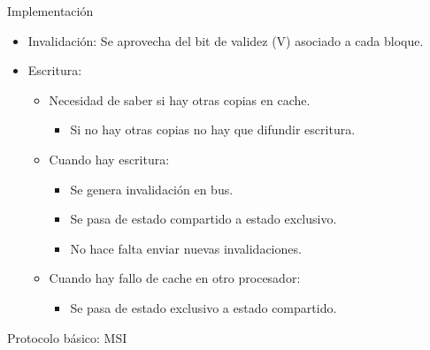 \documentclass[12pt, twoside, openright]{report} %
\begin{document}
    Implementación

    \begin{itemize}
    
    \item
      Invalidación: Se aprovecha del bit de validez (V) asociado a
      cada bloque.
    \item
      Escritura:

      \begin{itemize}
      
      \item
        Necesidad de saber si hay otras copias en cache.

        \begin{itemize}
        
        \item
          Si no hay otras copias no hay que difundir escritura.
        \end{itemize}
      \item
        Cuando hay escritura:

        \begin{itemize}
        
        \item
          Se genera invalidación en bus.
        \item
          Se pasa de estado compartido a estado exclusivo.
        \item
          No hace falta enviar nuevas invalidaciones.
        \end{itemize}
      \item
        Cuando hay fallo de cache en otro procesador:

        \begin{itemize}
        
        \item
          Se pasa de estado exclusivo a estado compartido.
        \end{itemize}
      \end{itemize}
    \end{itemize}

    Protocolo básico: MSI
\end{document}
